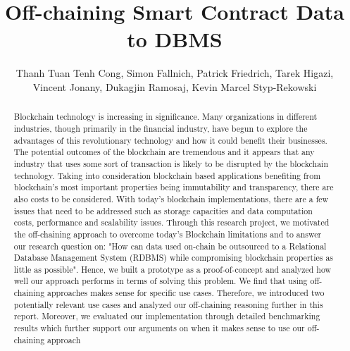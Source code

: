 \documentclass[a4paper]{article}
\title{Off-chaining Smart Contract Data to DBMS}
\author{Thanh Tuan Tenh Cong, 
Simon Fallnich,
Patrick Friedrich,
Tarek Higazi,\\
Vincent Jonany,
Dukagjin Ramosaj,
Kevin Marcel Styp-Rekowski}
\begin{document}
\maketitle

\begin{abstract}

Blockchain technology is increasing in significance. Many organizations in different industries, though primarily in the financial industry, have begun to explore the advantages of this revolutionary technology and how it could benefit their businesses. The potential outcomes of the blockchain are tremendous and it appears that any industry that uses some sort of transaction is likely to be disrupted by the blockchain technology. Taking into consideration blockchain based applications benefiting from blockchain's most important properties being immutability and transparency, there are also costs to be considered. With today's blockchain implementations, there are a few issues that need to be addressed such as storage capacities and data computation costs, performance and scalability issues. Through this research project, we motivated the off-chaining approach to overcome today's Blockchain limitations and to answer our research question on: "How can data used on-chain be outsourced to a Relational Database Management System (RDBMS) while compromising blockchain properties as little as possible". Hence, we built a prototype as a proof-of-concept and analyzed how well our approach performs in terms of solving this problem. We find that using off-chaining approaches makes sense for specific use cases. Therefore, we introduced two potentially relevant use cases and analyzed our off-chaining reasoning further in this report. Moreover, we evaluated our implementation through detailed benchmarking results which further support our arguments on when it makes sense to use our off-chaining approach


\end{abstract}
\newpage
\tableofcontents
\newpage











\newpage


\end{document}

